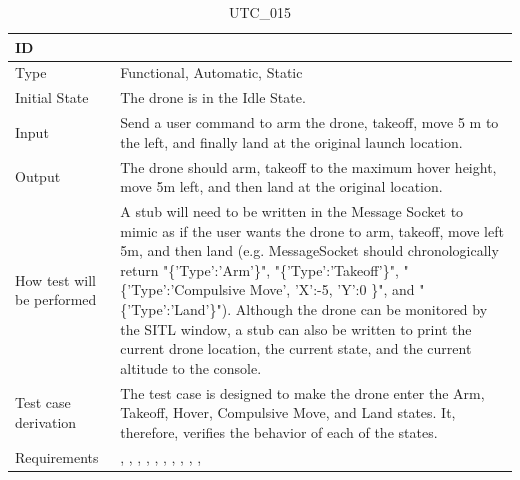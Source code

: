 \documentclass[12pt, titlepage]{article}
\begin{document}
\begin{table}[!h]
\begin{center}
\caption {UTC\_015}
\label{tab:UTC_015}
\begin{tabular}{ | m{3.2cm} | m{12.2cm} | } 
\hline
ID & \nameref{tab:UTC_015} \\ 
\hline
Type &  Functional, Automatic, Static  \\ 
\hline
Initial State & The drone is in the Idle State. \\ 
\hline
Input &  Send a user command to arm the drone, takeoff, move 5 m  to the left, and finally land at the original launch location. \\ 
\hline
Output &  The drone should arm, takeoff to the maximum hover height, move 5m left, and then land at the original location. \\ 
\hline
How test will be performed & A stub will need to be written in the Message Socket to mimic as if the user wants the drone to arm, takeoff, move left 5m, and then land (e.g. MessageSocket should chronologically return "\{'Type':'Arm'\}", "\{'Type':'Takeoff'\}", "\{'Type':'Compulsive Move', 'X':-5, 'Y':0 \}", and "\{'Type':'Land'\}"). Although the drone can be monitored by the SITL window, a stub can also be written to print the current drone location, the current state, and the current altitude to the console.\\ 
\hline
Test case derivation &  The test case is designed to make the drone enter the Arm, Takeoff, Hover, Compulsive Move, and Land states. It, therefore, verifies the behavior of each of the states.\\ 
\hline
Requirements & \nameref{STA_000}, \nameref{STA_001}, \nameref{STA_004}, \nameref{STA_011}, \nameref{STA_012}, \nameref{STA_013}, \nameref{TRANS_003}, \nameref{TRANS_009}, \nameref{TRANS_012}, \nameref{TRANS_013}, \nameref{TRANS_014} \\ 
\hline
\end{tabular}
\end{center}
\end{table}
\end{document}
